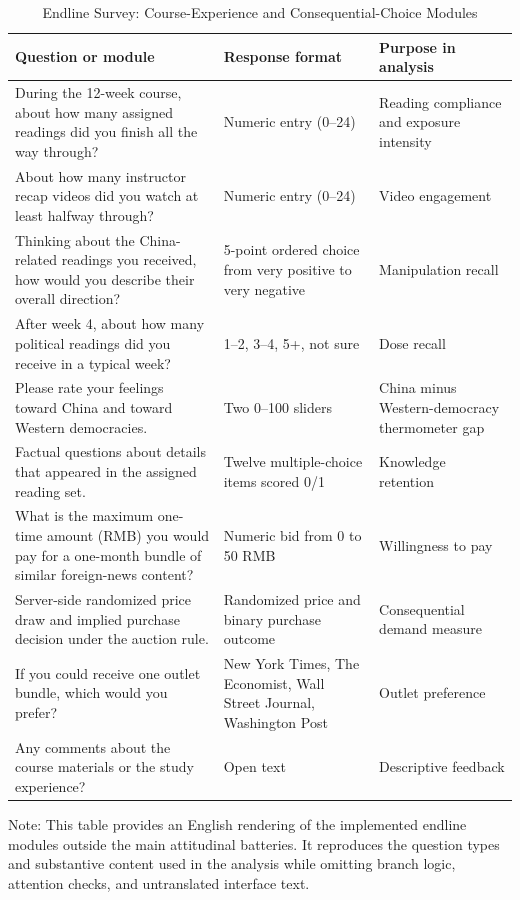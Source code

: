 \begin{table}[H]
\centering
\begin{threeparttable}
\caption{Endline Survey: Course-Experience and Consequential-Choice Modules}
\label{tab:endline_survey_selection}
\scriptsize
\setlength{\tabcolsep}{4pt}
\begin{tabularx}{\textwidth}{p{7.1cm} p{3.4cm} X}
\toprule
\textbf{Question or module} & \textbf{Response format} & \textbf{Purpose in analysis} \\
\midrule
During the 12-week course, about how many assigned readings did you finish all the way through? & Numeric entry (0--24) & Reading compliance and exposure intensity \\
\addlinespace
About how many instructor recap videos did you watch at least halfway through? & Numeric entry (0--24) & Video engagement \\
\addlinespace
Thinking about the China-related readings you received, how would you describe their overall direction? & 5-point ordered choice from very positive to very negative & Manipulation recall \\
\addlinespace
After week 4, about how many political readings did you receive in a typical week? & 1--2, 3--4, 5+, not sure & Dose recall \\
\addlinespace
Please rate your feelings toward China and toward Western democracies. & Two 0--100 sliders & China minus Western-democracy thermometer gap \\
\addlinespace
Factual questions about details that appeared in the assigned reading set. & Twelve multiple-choice items scored 0/1 & Knowledge retention \\
\addlinespace
What is the maximum one-time amount (RMB) you would pay for a one-month bundle of similar foreign-news content? & Numeric bid from 0 to 50 RMB & Willingness to pay \\
\addlinespace
Server-side randomized price draw and implied purchase decision under the auction rule. & Randomized price and binary purchase outcome & Consequential demand measure \\
\addlinespace
If you could receive one outlet bundle, which would you prefer? & New York Times, The Economist, Wall Street Journal, Washington Post & Outlet preference \\
\addlinespace
Any comments about the course materials or the study experience? & Open text & Descriptive feedback \\
\bottomrule
\end{tabularx}
\begin{tablenotes}[flushleft]
\footnotesize
\item Note: This table provides an English rendering of the implemented endline modules outside the main attitudinal batteries. It reproduces the question types and substantive content used in the analysis while omitting branch logic, attention checks, and untranslated interface text.
\end{tablenotes}
\end{threeparttable}
\end{table}
